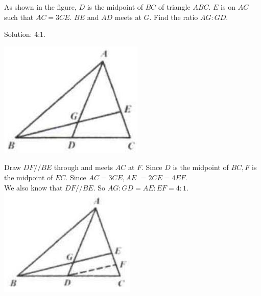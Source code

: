 \documentclass{article}
\begin{document}
As shown in the figure, \(D\) is the midpoint of \(B C\) of triangle \(A B C\). \(E\) is on \(A C\) such that \(A C=3 C E\). \(B E\) and \(A D\) meets at \(G\). Find the ratio \(A G: G D\).

Solution: 4:1.
\begin{center}
\includegraphics[width=\textwidth]{images/106(3).jpg}
\end{center}

Draw \(D F / / B E\) through and meets \(A C\) at \(F\). Since \(D\) is the midpoint of \(B C, F\) is the midpoint of \(E C\). Since \(A C=3 C E, A E\) \(=2 C E=4 E F\).\\
We also know that \(D F / / B E\). So \(A G: G D=A E: E F=4: 1\).\\
\centering
\includegraphics[width=\textwidth]{images/106(2).jpg}
\end{document}
